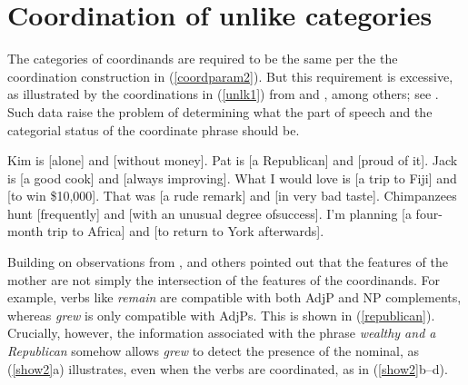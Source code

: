 \section{Coordination of unlike categories}\label{unlikessec}

The categories of coordinands are required to be the same per the the coordination construction in (\ref{coordparam2}).
But this requirement is excessive, as illustrated by  the coordinations in (\ref{unlk1}) from
\citet[]{bayer} and %
\citet[]{rodney}, %
among  others; see \citet[--170]{Chaves2013b-u}.
 Such data raise the problem of determining what the part of speech and the categorial status of the coordinate phrase should be.

\eal
\label{unlk1}
\ex Kim is [alone] and [without money].
\ex Pat is [a Republican] and [proud of it].
\ex Jack is [a good cook] and [always improving].
\ex What I would love is [a trip to Fiji] and [to win \$10,000].
\ex That was [a rude remark] and [in very bad taste].
\ex Chimpanzees hunt [frequently] and [with an unusual degree of\newline success].
\ex I'm planning [a four-month trip to Africa] and [to return to York after\-wards].
\zl

%
%
%
%
%


\noindent
Building on observations from \citet[417]{jacobson}, \citet{Sag:03} and others pointed out
that the features of the mother are not simply the intersection of the features of the coordinands. 
For example, verbs like \emph{remain} are compatible with both
AdjP and NP complements, whereas \emph{grew}
is only compatible with AdjPs.
This is shown in  (\ref{republican}).
Crucially, however, the information associated with
the phrase \emph{wealthy and a Republican}
somehow allows \emph{grew} to detect the presence of
the nominal, as (\ref{show2}a) illustrates, even
when the verbs
are coordinated, as in (\ref{show2}b--d).


